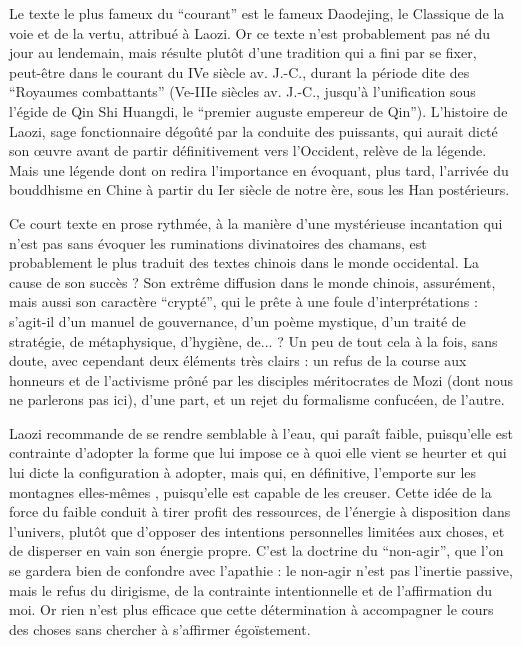 \documentclass[11pt,a4paper]{article} %
\begin{document}
Le texte le plus fameux du ``courant'' est le fameux Daodejing, le Classique de la voie et
de la vertu, attribué à Laozi.
Or ce texte n'est probablement pas né du jour au lendemain,
mais résulte plutôt d'une tradition qui a fini par se fixer, peut-être dans le courant du IVe
siècle av. J.-C., durant la période dite des ``Royaumes combattants'' (Ve-IIIe siècles av.
J.-C., jusqu'à l'unification sous l'égide de Qin Shi Huangdi, le ``premier auguste empereur
de Qin'').
L'histoire de Laozi, sage fonctionnaire dégoûté par la conduite des
puissants, qui aurait dicté son œuvre avant de partir définitivement vers l'Occident, relève
de la légende.
Mais une légende dont on redira l'importance en évoquant, plus tard,
l'arrivée du bouddhisme en Chine à partir du Ier siècle de notre ère, sous les Han postérieurs.

Ce court texte en prose rythmée, à la manière d'une mystérieuse incantation qui n'est pas
sans évoquer les ruminations divinatoires des chamans, est probablement le plus traduit
des textes chinois dans le monde occidental.
La cause de son succès ? Son extrême diffusion
dans le monde chinois, assurément, mais aussi son caractère ``crypté'', qui le prête à
une foule d'interprétations : s'agit-il d'un manuel de gouvernance, d'un poème mystique,
d'un traité de stratégie, de métaphysique, d'hygiène, de...
? Un peu de tout cela à la fois,
sans doute, avec cependant deux éléments très clairs : un refus de la course aux honneurs
et de l'activisme prôné par les disciples méritocrates de Mozi (dont nous ne parlerons pas
ici), d'une part, et un rejet du formalisme confucéen, de l'autre.

Laozi recommande de se rendre semblable à l'eau, qui paraît faible, puisqu'elle est
contrainte d'adopter la forme que lui impose ce à quoi elle vient se heurter et qui lui dicte
la configuration à adopter, mais qui, en définitive, l'emporte sur les montagnes elles-mêmes
, puisqu'elle est capable de les creuser.
Cette idée de la force du faible conduit à
tirer profit des ressources, de l'énergie à disposition dans l'univers, plutôt que d'opposer
des intentions personnelles limitées aux choses, et de disperser en vain son énergie propre.
C'est la doctrine du ``non-agir'', que l'on se gardera bien de confondre avec
l'apathie : le non-agir n'est pas l'inertie passive, mais le refus du dirigisme, de la
contrainte intentionnelle et de l'affirmation du moi.
Or rien n'est plus efficace que cette
détermination à accompagner le cours des choses sans chercher à s'affirmer égoïstement.
\end{document}
